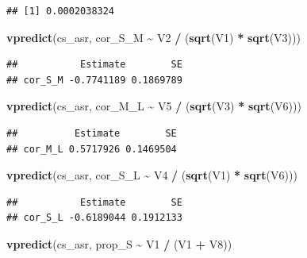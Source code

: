 \documentclass[
  12pt,
]{book}
\newenvironment{Shaded}{\begin{snugshade}}{\end{snugshade}}
\newcommand{\KeywordTok}[1]{\textcolor[rgb]{0.13,0.29,0.53}{\textbf{#1}}}
\newcommand{\NormalTok}[1]{#1}
\newcommand{\OperatorTok}[1]{\textcolor[rgb]{0.81,0.36,0.00}{\textbf{#1}}}
\newcommand{\StringTok}[1]{\textcolor[rgb]{0.31,0.60,0.02}{#1}}
\begin{document}
\begin{verbatim}
## [1] 0.0002038324
\end{verbatim}

\begin{Shaded}
\begin{Highlighting}[]
\KeywordTok{vpredict}\NormalTok{(cs\_asr, cor\_S\_M }\OperatorTok{\textasciitilde{}}\StringTok{ }\NormalTok{V2 }\OperatorTok{/}\StringTok{ }\NormalTok{(}\KeywordTok{sqrt}\NormalTok{(V1) }\OperatorTok{*}\StringTok{ }\KeywordTok{sqrt}\NormalTok{(V3)))}
\end{Highlighting}
\end{Shaded}

\begin{verbatim}
##           Estimate        SE
## cor_S_M -0.7741189 0.1869789
\end{verbatim}

\begin{Shaded}
\begin{Highlighting}[]
\KeywordTok{vpredict}\NormalTok{(cs\_asr, cor\_M\_L }\OperatorTok{\textasciitilde{}}\StringTok{ }\NormalTok{V5 }\OperatorTok{/}\StringTok{ }\NormalTok{(}\KeywordTok{sqrt}\NormalTok{(V3) }\OperatorTok{*}\StringTok{ }\KeywordTok{sqrt}\NormalTok{(V6)))}
\end{Highlighting}
\end{Shaded}

\begin{verbatim}
##          Estimate        SE
## cor_M_L 0.5717926 0.1469504
\end{verbatim}

\begin{Shaded}
\begin{Highlighting}[]
\KeywordTok{vpredict}\NormalTok{(cs\_asr, cor\_S\_L }\OperatorTok{\textasciitilde{}}\StringTok{ }\NormalTok{V4 }\OperatorTok{/}\StringTok{ }\NormalTok{(}\KeywordTok{sqrt}\NormalTok{(V1) }\OperatorTok{*}\StringTok{ }\KeywordTok{sqrt}\NormalTok{(V6)))}
\end{Highlighting}
\end{Shaded}

\begin{verbatim}
##           Estimate        SE
## cor_S_L -0.6189044 0.1912133
\end{verbatim}

\begin{Shaded}
\begin{Highlighting}[]
\KeywordTok{vpredict}\NormalTok{(cs\_asr, prop\_S }\OperatorTok{\textasciitilde{}}\StringTok{ }\NormalTok{V1 }\OperatorTok{/}\StringTok{ }\NormalTok{(V1 }\OperatorTok{+}\StringTok{ }\NormalTok{V8))}
\end{Highlighting}
\end{Shaded}
\end{document}
